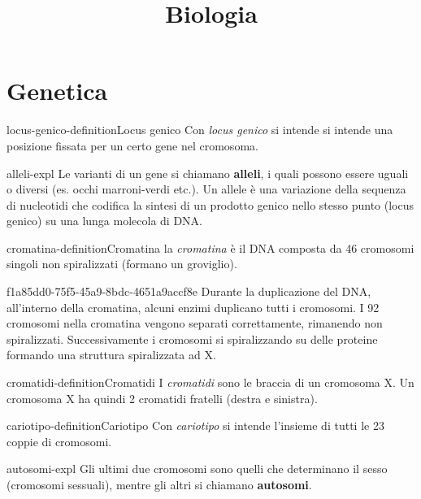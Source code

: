 \documentclass[preview]{standalone}
\begin{document}
\title{Biologia}
\genpage

\section{Genetica}

\begin{snippetdefinition}{locus-genico-definition}{Locus genico}
    Con \textit{locus genico} si intende si intende una posizione fissata per
    un certo gene nel cromosoma.
\end{snippetdefinition}

\begin{snippet}{alleli-expl}
    Le varianti di un gene si chiamano \textbf{alleli}, i quali possono essere uguali o diversi
    (es. occhi marroni-verdi etc.). Un allele è una variazione della sequenza di nucleotidi che codifica la sintesi di un prodotto genico nello stesso punto (locus genico) su una lunga molecola di DNA.
\end{snippet}

\begin{snippetdefinition}{cromatina-definition}{Cromatina}
    la \textit{cromatina} è il DNA composta da 46 cromosomi singoli non spiralizzati (formano un groviglio).
\end{snippetdefinition}

\begin{snippet}{f1a85dd0-75f5-45a9-8bdc-4651a9accf8e}
    Durante la duplicazione del DNA, all'interno della cromatina,
    alcuni enzimi duplicano tutti i cromosomi.
    I 92 cromosomi nella cromatina vengono separati correttamente, rimanendo non spiralizzati.
    Successivamente i cromosomi si spiralizzando su delle proteine formando una struttura spiralizzata ad X.
\end{snippet}


\begin{snippetdefinition}{cromatidi-definition}{Cromatidi}
    I \textit{cromatidi} sono le braccia di un cromosoma X.
    Un cromosoma X ha quindi 2 cromatidi fratelli (destra e sinistra).
\end{snippetdefinition}


\begin{snippetdefinition}{cariotipo-definition}{Cariotipo}
    Con \textit{cariotipo} si intende l'insieme di tutti le 23 coppie di cromosomi.
\end{snippetdefinition}

\begin{snippet}{autosomi-expl}
    Gli ultimi due cromosomi sono quelli che determinano il sesso (cromosomi sessuali),
    mentre gli altri si chiamano \textbf{autosomi}.
\end{snippet}

\end{document}
